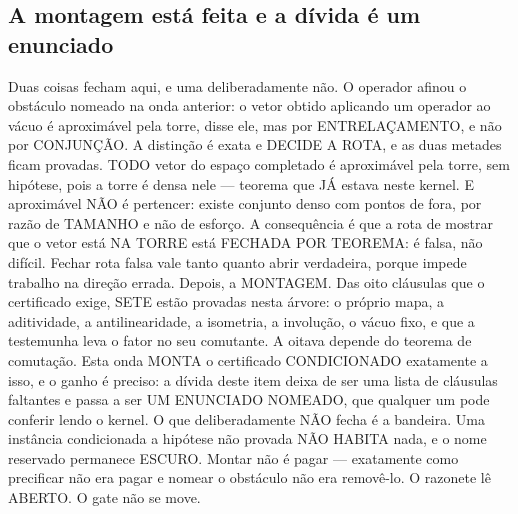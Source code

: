 \documentclass[11pt]{article}
\theoremstyle{definition}\newtheorem{deriv}{Derivação}
\begin{document}
\subsection*{A montagem est\'a feita e a d\'ivida \'e um enunciado}Duas coisas fecham aqui, e uma deliberadamente n\~ao. O operador afinou o obst\'aculo nomeado na onda anterior: o vetor obtido aplicando um operador ao v\'acuo \'e aproxim\'avel pela torre, disse ele, mas por ENTRELA\c{C}AMENTO, e n\~ao por CONJUN\c{C}\~AO. A distin\c{c}\~ao \'e exata e DECIDE A ROTA, e as duas metades ficam provadas. TODO vetor do espa\c{c}o completado \'e aproxim\'avel pela torre, sem hip\'otese, pois a torre \'e densa nele --- teorema que J\'A estava neste kernel. E aproxim\'avel N\~AO \'e pertencer: existe conjunto denso com pontos de fora, por raz\~ao de TAMANHO e n\~ao de esfor\c{c}o. A consequ\^encia \'e que a rota de mostrar que o vetor est\'a NA TORRE est\'a FECHADA POR TEOREMA: \'e falsa, n\~ao dif\'icil. Fechar rota falsa vale tanto quanto abrir verdadeira, porque impede trabalho na dire\c{c}\~ao errada. Depois, a MONTAGEM. Das oito cl\'ausulas que o certificado exige, SETE est\~ao provadas nesta \'arvore: o pr\'oprio mapa, a aditividade, a antilinearidade, a isometria, a involu\c{c}\~ao, o v\'acuo fixo, e que a testemunha leva o fator no seu comutante. A oitava depende do teorema de comuta\c{c}\~ao. Esta onda MONTA o certificado CONDICIONADO exatamente a isso, e o ganho \'e preciso: a d\'ivida deste item deixa de ser uma lista de cl\'ausulas faltantes e passa a ser UM ENUNCIADO NOMEADO, que qualquer um pode conferir lendo o kernel. O que deliberadamente N\~AO fecha \'e a bandeira. Uma inst\^ancia condicionada a hip\'otese n\~ao provada N\~AO HABITA nada, e o nome reservado permanece ESCURO. Montar n\~ao \'e pagar --- exatamente como precificar n\~ao era pagar e nomear o obst\'aculo n\~ao era remov\^e-lo. O razonete l\^e ABERTO. O gate n\~ao se move.
\end{document}
